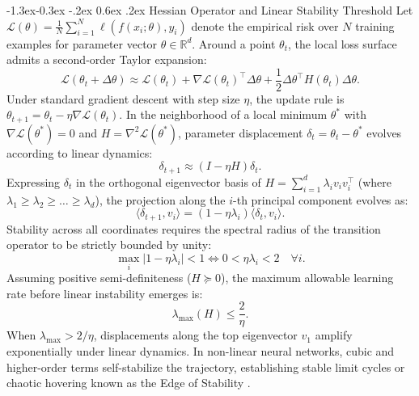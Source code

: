\documentclass[10pt,twocolumn]{article}
\makeatletter
\renewcommand\subsection{\@startsection{subsection}{2}{\z@}%
                                     {-1.3ex\@plus -0.3ex \@minus -.2ex}%
                                     {0.6ex \@plus .2ex}%
                                     {\normalfont\normalsize\bfseries}}
\makeatother
\begin{document}
\subsection{Hessian Operator and Linear Stability Threshold}
Let $\mathcal{L}(\theta) = \frac{1}{N} \sum_{i=1}^N \ell(f(x_i; \theta), y_i)$ denote the empirical risk over $N$ training examples for parameter vector $\theta \in \mathbb{R}^d$. Around a point $\theta_t$, the local loss surface admits a second-order Taylor expansion:
\begin{equation}
\mathcal{L}(\theta_t + \Delta \theta) \approx \mathcal{L}(\theta_t) + \nabla \mathcal{L}(\theta_t)^\top \Delta \theta + \frac{1}{2} \Delta \theta^\top H(\theta_t) \Delta \theta.
\end{equation}
Under standard gradient descent with step size $\eta$, the update rule is $\theta_{t+1} = \theta_t - \eta \nabla \mathcal{L}(\theta_t)$. In the neighborhood of a local minimum $\theta^*$ with $\nabla \mathcal{L}(\theta^*) = 0$ and $H = \nabla^2 \mathcal{L}(\theta^*)$, parameter displacement $\delta_t = \theta_t - \theta^*$ evolves according to linear dynamics:
\begin{equation}
\delta_{t+1} \approx (I - \eta H) \delta_t.
\end{equation}
Expressing $\delta_t$ in the orthogonal eigenvector basis of $H = \sum_{i=1}^d \lambda_i v_i v_i^\top$ (where $\lambda_1 \ge \lambda_2 \ge \dots \ge \lambda_d$), the projection along the $i$-th principal component evolves as:
\begin{equation}
\langle \delta_{t+1}, v_i \rangle = (1 - \eta \lambda_i) \langle \delta_t, v_i \rangle.
\end{equation}
Stability across all coordinates requires the spectral radius of the transition operator to be strictly bounded by unity:
\begin{equation}
\max_{i} |1 - \eta \lambda_i| < 1 \iff 0 < \eta \lambda_i < 2 \quad \forall i.
\end{equation}
Assuming positive semi-definiteness ($H \succeq 0$), the maximum allowable learning rate before linear instability emerges is:
\begin{equation}
\lambda_{\max}(H) \le \frac{2}{\eta}.
\end{equation}
When $\lambda_{\max} > 2/\eta$, displacements along the top eigenvector $v_1$ amplify exponentially under linear dynamics. In non-linear neural networks, cubic and higher-order terms self-stabilize the trajectory, establishing stable limit cycles or chaotic hovering known as the Edge of Stability \cite{cohen2021gradient, damian2023self}.
\end{document}
